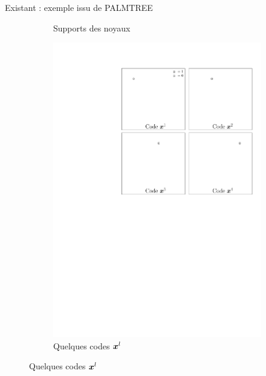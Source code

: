 \begin{frame}{Existant : exemple issu de PALMTREE}
\begin{figure}[!ht]
\begin{subfigure}[b]{0.30\textwidth}
		\caption{Supports des noyaux}
\end{subfigure}
\begin{subfigure}[b]{0.30\textwidth}\centering
	\includegraphics[width=\textwidth]{figures-masters-thesis/tree-learn-setup/codes.pdf}
	\caption{Quelques codes $\bm{x}^l$}
\end{subfigure}
\end{figure}
\end{frame}


